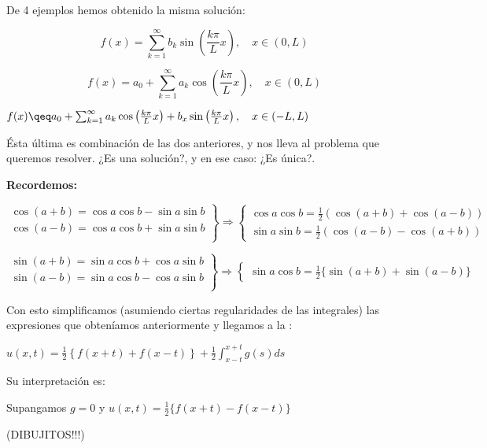 		De 4 ejemplos hemos obtenido la misma solución:

		\[ f(x) = \sum_{k=1}^{\infty} b_k \sin \left( \frac{k \pi}{L} x \right), \quad x \in (0,L) \]

		\[ f(x) = a_0 + \sum^{\infty}_{k=1} a_k \cos \left( \frac{k \pi}{L} x \right), \quad x \in (0,L) \]

		\(
		f(x) \qeq a_0 + \sum^{\infty}_{k=1} a_k \cos \left( \frac{k \pi}{L} x \right) + b_x \sin \left( \frac{k \pi}{L} x \right), \quad x \in (-L,L)
		\)

		Ésta última es combinación de las dos anteriores, y nos lleva al problema que queremos resolver. ¿Es una solución?, y en ese caso: ¿Es única?.

		\textbf{Recordemos:}

		\[
		\left. \begin{array}{r}
			\cos (a + b) = \cos a \cos b - \sin a \sin b \\
			\cos (a - b) = \cos a \cos b + \sin a \sin b \\
		\end{array} \right\} \Rightarrow \left\{ \begin{array}{l}
			\cos a \cos b = \frac{1}{2} (\cos (a+b) + \cos (a-b)) \\
			\sin a \sin b = \frac{1}{2} (\cos (a-b) - \cos (a+b))
		\end{array} \right.
		\]

		\[
		\left. \begin{array}{r}
			\sin (a + b) = \sin a \cos b + \cos a \sin b \\
			\sin (a - b) = \sin a \cos b - \cos a \sin b \\
		\end{array} \right\} \Rightarrow \left\{ \begin{array}{l}
			\sin a \cos b = \frac{1}{2} \{\sin (a+b) + \sin(a-b)\}
		\end{array} \right.
		\]

		Con esto simplificamos (asumiendo ciertas regularidades de las integrales) las expresiones que obteníamos anteriormente y llegamos a la :

		\(
		u(x,t) = \frac{1}{2} \left\{ f(x+t) + f(x-t) \right\} + \frac{1}{2} \int^{x+t}_{x-t} g(s) ds  \label{eq:DALEMBERT}\)

		Su interpretación es:

		Supangamos $g=0$ y $u(x,t) = \frac{1}{2} \{ f(x+t) - f(x-t)\} $

		(DIBUJITOS!!!)

